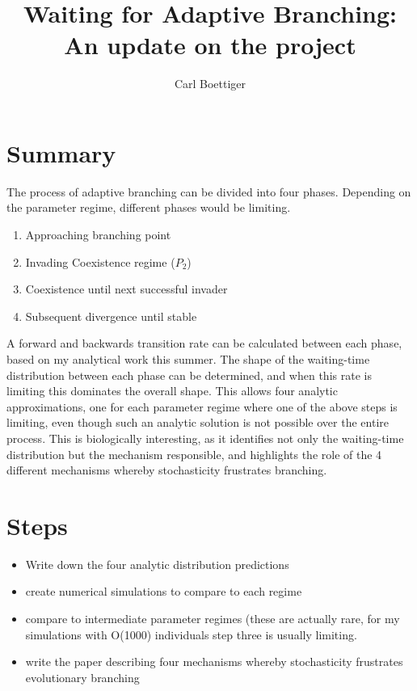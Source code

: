 \documentclass[a4paper]{article}
\title{Waiting for Adaptive Branching: \\ An update on the project}
\author{Carl Boettiger}
\begin{document}
\maketitle
\section{Summary}
The process of adaptive branching can be divided into four phases.  Depending on the parameter regime, different phases would be limiting. 
\begin{enumerate}
\item Approaching branching point
\item Invading Coexistence regime ($P_2$)
\item Coexistence until next successful invader
\item Subsequent divergence until stable
\end{enumerate}

A forward and backwards transition rate can be calculated between each phase, based on my analytical work this summer.  The shape of the waiting-time distribution between each phase can be determined, and when this rate is limiting this dominates the overall shape.  This allows four analytic approximations, one for each parameter regime where one of the above steps is limiting, even though such an analytic solution is not possible over the entire process.   This is biologically interesting, as it identifies not only the waiting-time distribution but the mechanism responsible, and highlights the role of the 4 different mechanisms whereby stochasticity frustrates branching.  

\section{Steps}
\begin{itemize}
\item Write down the four analytic distribution predictions 
\item create numerical simulations to compare to each regime
\item compare to intermediate parameter regimes (these are actually rare, for my simulations with O(1000) individuals step three is usually limiting.
\item write the paper describing four mechanisms whereby stochasticity frustrates evolutionary branching
\end{itemize}
\end{document}

